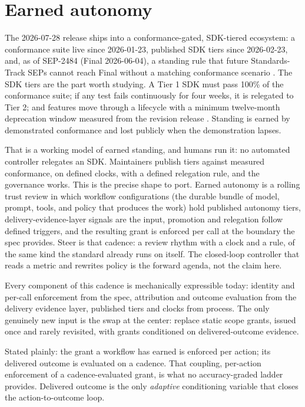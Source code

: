 \section{Earned autonomy}

The 2026-07-28 release ships into a conformance-gated, SDK-tiered ecosystem: a
conformance suite live since 2026-01-23, published SDK tiers since 2026-02-23,
and, as of SEP-2484 (Final 2026-06-04), a standing rule that future
Standards-Track SEPs cannot reach Final without a matching conformance scenario
\citep{sep2484, sdktiers}. The SDK tiers are the part worth studying. A Tier 1
SDK must pass 100\% of the conformance suite; if any test fails continuously for
four weeks, it is relegated to Tier 2; and features move through a lifecycle with
a minimum twelve-month deprecation window measured from the revision release
\citep{sdktiers, mcplifecycle}. Standing is earned by demonstrated conformance
and lost publicly when the demonstration lapses.

That is a working model of earned standing, and humans run it: no automated
controller relegates an SDK. Maintainers publish tiers against measured
conformance, on defined clocks, with a defined relegation rule, and the
governance works. This is the precise shape to port. Earned autonomy is a rolling
trust review in which workflow configurations (the durable bundle of model,
prompt, tools, and policy that produces the work) hold published autonomy tiers,
delivery-evidence-layer signals are the input, promotion and relegation follow
defined triggers, and the resulting grant is enforced per call at the boundary
the spec provides. Steer is that cadence: a review rhythm with a clock and a
rule, of the same kind the standard already runs on itself. The closed-loop
controller that reads a metric and rewrites policy is the forward agenda, not the
claim here.

Every component of this cadence is mechanically expressible today: identity and
per-call enforcement from the spec, attribution and outcome evaluation from the
delivery evidence layer, published tiers and clocks from process. The only
genuinely new input is the swap at the center: replace static scope grants,
issued once and rarely revisited, with grants conditioned on delivered-outcome
evidence.

Stated plainly: the grant a workflow has earned is enforced per action; its
delivered outcome is evaluated on a cadence. That coupling, per-action
enforcement of a cadence-evaluated grant, is what no accuracy-graded ladder
provides. Delivered outcome is the only \emph{adaptive} conditioning variable
that closes the action-to-outcome loop.

